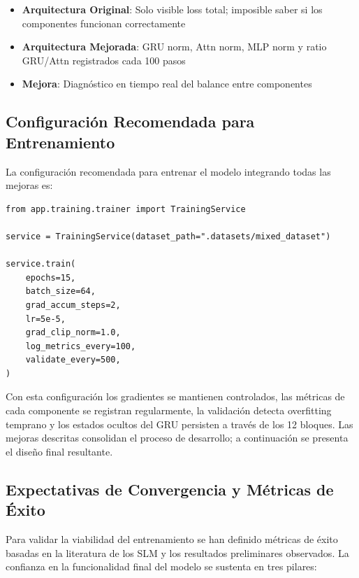 \begin{itemize}
    \item \textbf{Arquitectura Original}: Solo visible loss total; imposible saber si los componentes funcionan correctamente
    \item \textbf{Arquitectura Mejorada}: GRU norm, Attn norm, MLP norm y ratio GRU/Attn registrados cada 100 pasos
    \item \textbf{Mejora}: Diagnóstico en tiempo real del balance entre componentes
\end{itemize}

\subsection{Configuración Recomendada para Entrenamiento}

La configuración recomendada para entrenar el modelo integrando todas las mejoras es:

\begin{verbatim}
from app.training.trainer import TrainingService

service = TrainingService(dataset_path=".datasets/mixed_dataset")

service.train(
    epochs=15,
    batch_size=64,
    grad_accum_steps=2,
    lr=5e-5,
    grad_clip_norm=1.0,
    log_metrics_every=100,
    validate_every=500,
)
\end{verbatim}

Con esta configuración los gradientes se mantienen controlados, las métricas de cada componente se registran regularmente, la validación detecta overfitting temprano y los estados ocultos del GRU persisten a través de los 12 bloques. Las mejoras descritas consolidan el proceso de desarrollo; a continuación se presenta el diseño final resultante.

\subsection{Expectativas de Convergencia y Métricas de Éxito}

Para validar la viabilidad del entrenamiento se han definido métricas de éxito basadas en la literatura de los SLM y los resultados preliminares observados. La confianza en la funcionalidad final del modelo se sustenta en tres pilares:

